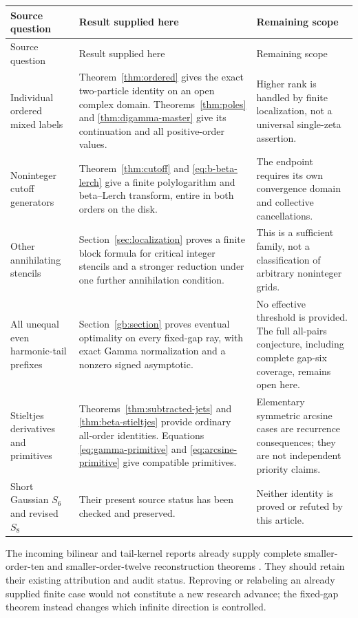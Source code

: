 \documentclass[11pt,a4paper]{article}
\numberwithin{equation}{section}
\theoremstyle{definition}
\theoremstyle{remark}
\begin{document}
\begin{longtable}{@{}>{\raggedright\arraybackslash}p{}>{\raggedright\arraybackslash}p{}>{\raggedright\arraybackslash}p{}@{}}
\toprule
Source question & Result supplied here & Remaining scope\\
\midrule
\endfirsthead
\toprule
Source question & Result supplied here & Remaining scope\\
\midrule
\endhead
Individual ordered mixed labels &
Theorem~\ref{thm:ordered} gives the exact two-particle identity on an
open complex domain. Theorems~\ref{thm:poles} and
\ref{thm:digamma-master} give its continuation and all positive-order
values. &
Higher rank is handled by finite localization, not a universal
single-zeta assertion.\\[5pt]
Noninteger cutoff generators &
Theorem~\ref{thm:cutoff} and \eqref{eq:b-beta-lerch} give a finite
polylogarithm and beta--Lerch transform, entire in both orders on
the disk. &
The endpoint requires its own convergence domain and collective
cancellations.\\[5pt]
Other annihilating stencils &
Section~\ref{sec:localization} proves a finite block formula for
critical integer stencils and a stronger reduction under one further
annihilation condition. &
This is a sufficient family, not a classification of arbitrary
noninteger grids.\\[5pt]
All unequal even harmonic-tail prefixes &
Section~\ref{gb:section} proves eventual optimality on every fixed-gap
ray, with exact Gamma normalization and a nonzero signed asymptotic. &
No effective threshold is provided. The full all-pairs conjecture,
including complete gap-six coverage, remains open here.\\[5pt]
Stieltjes derivatives and primitives &
Theorems~\ref{thm:subtracted-jets} and \ref{thm:beta-stieltjes}
provide ordinary all-order identities. Equations
\eqref{eq:gamma-primitive} and \eqref{eq:arcsine-primitive}
give compatible primitives. &
Elementary symmetric arcsine cases are recurrence consequences;
they are not independent priority claims.\\[5pt]
Short Gaussian $S_6$ and revised $S_8$ &
Their present source status has been checked and preserved. &
Neither identity is proved or refuted by this article.\\
\bottomrule
\end{longtable}

The incoming bilinear and tail-kernel reports already supply complete
smaller-order-ten and smaller-order-twelve reconstruction
theorems \cite{repo:bilinear,repo:tail-kernels}. They should
retain their existing attribution and audit status. Reproving or
relabeling an already supplied finite case would not constitute a
new research advance; the fixed-gap theorem instead changes which
infinite direction is controlled.
\end{document}
